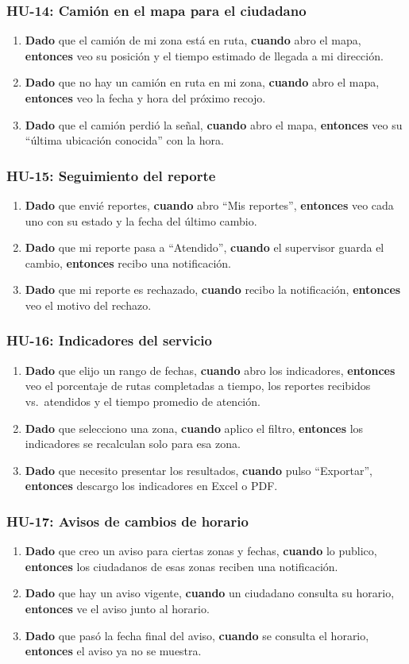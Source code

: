 \documentclass[11pt,a4paper]{article}
\newcommand{\dce}[3]{\textbf{Dado} #1, \textbf{cuando} #2, \textbf{entonces} #3}
\newcommand{\criterios}[1]{\subsubsection*{#1}}
\begin{document}
\criterios{HU-14: Camión en el mapa para el ciudadano}
\begin{enumerate}
  \item \dce{que el camión de mi zona está en ruta}{abro el mapa}{veo su posición y el tiempo estimado de llegada a mi dirección.}
  \item \dce{que no hay un camión en ruta en mi zona}{abro el mapa}{veo la fecha y hora del próximo recojo.}
  \item \dce{que el camión perdió la señal}{abro el mapa}{veo su ``última ubicación conocida'' con la hora.}
\end{enumerate}

\criterios{HU-15: Seguimiento del reporte}
\begin{enumerate}
  \item \dce{que envié reportes}{abro ``Mis reportes''}{veo cada uno con su estado y la fecha del último cambio.}
  \item \dce{que mi reporte pasa a ``Atendido''}{el supervisor guarda el cambio}{recibo una notificación.}
  \item \dce{que mi reporte es rechazado}{recibo la notificación}{veo el motivo del rechazo.}
\end{enumerate}

\criterios{HU-16: Indicadores del servicio}
\begin{enumerate}
  \item \dce{que elijo un rango de fechas}{abro los indicadores}{veo el porcentaje de rutas completadas a tiempo, los reportes recibidos vs.\ atendidos y el tiempo promedio de atención.}
  \item \dce{que selecciono una zona}{aplico el filtro}{los indicadores se recalculan solo para esa zona.}
  \item \dce{que necesito presentar los resultados}{pulso ``Exportar''}{descargo los indicadores en Excel o PDF.}
\end{enumerate}

\criterios{HU-17: Avisos de cambios de horario}
\begin{enumerate}
  \item \dce{que creo un aviso para ciertas zonas y fechas}{lo publico}{los ciudadanos de esas zonas reciben una notificación.}
  \item \dce{que hay un aviso vigente}{un ciudadano consulta su horario}{ve el aviso junto al horario.}
  \item \dce{que pasó la fecha final del aviso}{se consulta el horario}{el aviso ya no se muestra.}
\end{enumerate}
\end{document}
